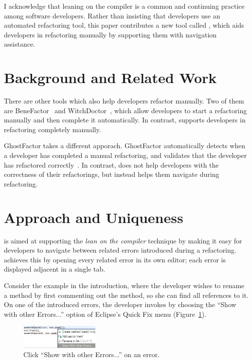 \documentclass{sigplanconf}
\begin{document}
I acknowledge that leaning on the compiler is a common and continuing practice
among software developers. Rather than insisting that developers use an
automated refactoring tool, this paper contributes a new tool
called \pname{}, which aids developers in refactoring
manually by supporting them with navigation assistance.

\section{Background and Related Work}
There are other tools which also help developers refactor manually. Two of them
are
BeneFactor~\cite{bene-factor} and WitchDoctor~\cite{witch-doctor},
which allow developers to start a refactoring manually and then
complete it automatically.
In contrast, \pname{} supports developers in refactoring completely manually.

GhostFactor takes a different apporach. GhostFactor automatically detects
when a developer has completed a manual refactoring, and validates
that the developer has refactored correctly~\cite{ghost-factor}.
In contrast, \pname{} does not help developers with the correctness of
their refactorings, but instead helps them navigate during refactoring.

\section{Approach and Uniqueness}
\pname{} is aimed at supporting the \textit{lean on the compiler} technique
by making it easy for developers to navigate between related errors introduced
during a refactoring. \pname{} achieves this by opening every related error
in its own editor; each error is displayed adjacent in a single tab.

Consider the example in the introduction, where the developer
wishes to rename a method by first commenting out
the method, so she can find all references to it.
On one of the introduced errors, the developer invokes \pname{} by choosing
the ``Show with other Errors...'' option of Eclipse's Quick Fix
menu (Figure~\ref{quick}).

\begin{figure}[h]
\begin{center}
\includegraphics[width=0.35\textwidth]{quick-fix.png}
\caption{Click ``Show with other Errors...'' on an error.\label{quick}}
\end{center}
\end{figure}
\end{document}
